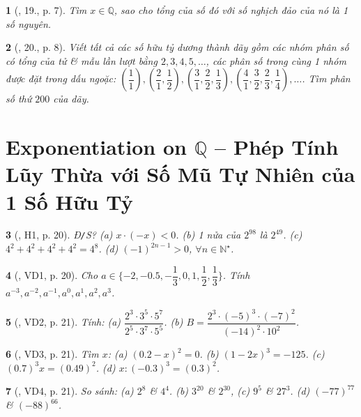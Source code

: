 \documentclass{article}
\newtheorem{baitoan}{}
\begin{document}
\begin{baitoan}[\cite{Binh_Toan_7_tap_1}, 19., p. 7]
	Tìm $x\in\mathbb{Q}$, sao cho tổng của số đó với số nghịch đảo của nó là 1 số nguyên.
\end{baitoan}

\begin{baitoan}[\cite{Binh_Toan_7_tap_1}, 20., p. 8]
	Viết tất cả các số hữu tỷ dương  thành dãy gồm các nhóm phân số có tổng của tử \& mẫu lần lượt bằng $2,3,4,5,\ldots$, các phân số trong cùng 1 nhóm được đặt trong dấu ngoặc: $\left(\dfrac{1}{1}\right),\left(\dfrac{2}{1},\dfrac{1}{2}\right),\left(\dfrac{3}{1},\dfrac{2}{2},\dfrac{1}{3}\right),\left(\dfrac{4}{1},\dfrac{3}{2},\dfrac{2}{3},\dfrac{1}{4}\right),\ldots$. Tìm phân số thứ $200$ của dãy.
\end{baitoan}


\section{Exponentiation on $\mathbb{Q}$ -- Phép Tính Lũy Thừa với Số Mũ Tự Nhiên của 1 Số Hữu Tỷ}

\begin{baitoan}[\cite{Binh_boi_duong_Toan_7_tap_1}, H1, p. 20]
	{\rm Đ{\tt/}S?} (a) $x\cdot(-x) < 0$. (b) 1 nửa của $2^{98}$ là $2^{49}$. (c) $4^2 + 4^2 + 4^2 + 4^2 = 4^8$. (d) $(-1)^{2n - 1} > 0$, $\forall n\in\mathbb{N}^\star$.
\end{baitoan}

\begin{baitoan}[\cite{Binh_boi_duong_Toan_7_tap_1}, VD1, p. 20]
	Cho $a\in\{-2,-0.5,-\dfrac{1}{3},0,1,\dfrac{1}{2},\dfrac{1}{3}\}$. Tính $a^{-3},a^{-2},a^{-1},a^0,a^1,a^2,a^3$.
\end{baitoan}

\begin{baitoan}[\cite{Binh_boi_duong_Toan_7_tap_1}, VD2, p. 21]
	Tính: (a) $\dfrac{2^3\cdot3^5\cdot5^7}{2^5\cdot3^7\cdot5^5}$. (b) $B = \dfrac{2^3\cdot(-5)^3\cdot(-7)^2}{(-14)^2\cdot10^2}$.
\end{baitoan}

\begin{baitoan}[\cite{Binh_boi_duong_Toan_7_tap_1}, VD3, p. 21]
	Tìm $x$: (a) $(0.2 - x)^2 = 0$. (b) $(1 - 2x)^3 = -125$. (c) $(0.7)^3x = (0.49)^2$. (d) $x:(-0.3)^3 = (0.3)^2$.
\end{baitoan}

\begin{baitoan}[\cite{Binh_boi_duong_Toan_7_tap_1}, VD4, p. 21]
	So sánh: (a) $2^8$ \& $4^4$. (b) $3^{20}$ \& $2^{30}$, (c) $9^5$ \& $27^3$. (d) $(-77)^{77}$ \& $(-88)^{66}$.
\end{baitoan}
\end{document}
